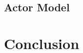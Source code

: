 \documentclass[12pt]{article}
\begin{document}
	\subsection{Actor Model}				\label{sec:actorModel}			
\newpage

\section{Conclusion}						\label{sec:conclusion}			
\newpage



\end{document}
